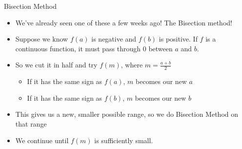 {}\documentclass[letterpaper,
compress,
xcolor=x11names,
]{beamer}
\begin{document}

\begin{frame}{Bisection Method}
	\footnotesize
	\begin{itemize}
		\item We've already seen one of these a few weeks ago! The Bisection method!
		\item<2-> Suppose we know $f(a)$ is negative and $f(b)$ is positive. If $f$ is a continuous function, it must pass through 0 between $a$ and $b$.
		\item<3-> So we cut it in half and try $f(m)$, where $m  =\frac{a+b}{2}$
		\begin{itemize}
			\item If it has the same sign as $f(a)$, $m$ becomes our new $a$
			\item If it has the same sign as $f(b)$, $m$ becomes our new $b$
		\end{itemize} 
		\item<4-> This gives us a new, smaller possible range, so we do Bisection Method on that range
		\item<4-> We continue until $f(m)$ is sufficiently small.
	\end{itemize}
\end{frame}

\end{document}
